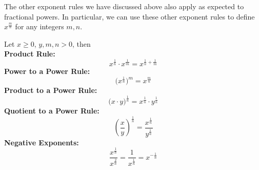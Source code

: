 \documentclass{ximera}
\begin{document}
  The other exponent rules we have discussed above also apply as expected to fractional powers. In particular, we can use these other exponent rules to define $x^{\frac{m}{n}}$ for any integers $m,n$.
  
  \begin{callout}
  Let $x\geq 0$, $y,m,n >0$, then \\

 \textbf{Product Rule:}
$$ x^{\frac{1}{n}} \cdot x^{\frac{1}{m}} = x^{\frac{1}{n} + \frac{1}{m}}
$$
  \textbf{Power to a Power Rule:}
  $$ \big(x^{\frac{1}{n}}\big)^m = x^{\frac{m}{n}} $$
   \textbf{Product to a Power Rule:}
    $$\big(x \cdot y \big)^{\frac{1}{n}} = x^{\frac{1}{n}} \cdot y^{\frac{1}{n}}$$
    \textbf{Quotient to a Power Rule:}
  $$\left(\frac{x}{y}\right)^{\frac{1}{n}} = \frac{x^{\frac{1}{n}}}{y^{\frac{1}{n}}} $$
 \textbf{Negative Exponents:}
  $$\frac{x^{\frac{1}{n}}}{x^{\frac{2}{n}}} = \frac{1}{x^{\frac{1}{n}}} = x^{-\frac{1}{n}}$$
 \end{callout}
    
\end{document}
